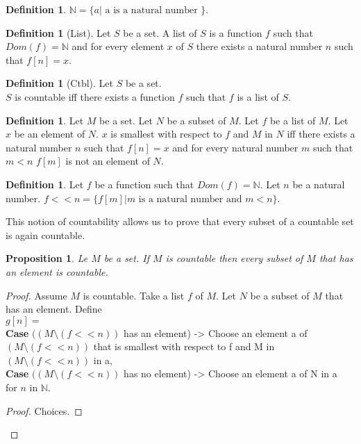 \documentclass[10pt]{article}
\newenvironment{forthel}{\begin{leftbar}}{\end{leftbar}}
\newcommand{\N}{\mathbb{N}}
\theoremstyle{definition}
\newtheorem{definition}[theorem]{Definition}
\theoremstyle{plain}
\newtheorem{proposition}[theorem]{Proposition}
\theoremstyle{remark}
\begin{document}
\begin{forthel}
	\begin{definition}
		$\N = \{ a | \text{ a is a natural number }\}$.
	\end{definition}
	\begin{definition}[List]
		Let $S$ be a set. A list of $S$ is a function $f$ such that $Dom(f) = \N$ and for every element $x$ of $S$ there exists a natural number $n$ such that $f[n] = x$.
	\end{definition}
	\begin{definition}[Ctbl]
		Let $S$ be a set. \\
		$S$ is countable iff there exists a function $f$ such that $f$ is a list of $S$.
	\end{definition}
	\begin{definition}
		Let $M$ be a set. Let $N$ be a subset of $M$. Let $f$ be a list of $M$. Let $x$ be an element of $N$. $x$ is smallest with respect to $f$ and $M$ in $N$ iff there exists a natural number $n$ such that $f[n]=x$ and for every natural number $m$ such that $m < n$ $f[m]$ is not an element of $N$.
	\end{definition}
	\begin{definition}
		Let $f$ be a function such that $Dom(f)= \N$. Let $n$ be a natural number. $f << n = \{f[m]| m\text{ is a natural number and } m<n \}$.
	\end{definition}
\end{forthel}
This notion of countability allows us to prove that every subset of a countable set is again countable.
\begin{forthel}
	\begin{proposition}
	Le $M$ be a set. If $M$ is countable then every subset of $M$ that has an element is countable.
	\end{proposition}
	\begin{proof}
		Assume $M$ is countable. Take a list $f$ of $M$. Let $N$ be a subset of $M$ that has an element. Define \\
		$g[n] = $ \\
		\hspace*{1em}\textbf{Case} $((M\setminus (f << n))$ has an element) -> Choose an element a of $(M\setminus (f << n))$ that is smallest with respect to f and M in $(M\setminus(f << n))$ in a, \\
		\hspace*{1em}\textbf{Case} $((M\setminus(f<<n))$ has no element) -> Choose an element a of N in a \\
		for $n$ in $\N$.
		\begin{proof}
			Choices.
		\end{proof}
	\end{proof}
\end{forthel}
\end{document}
